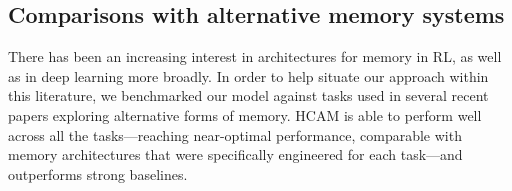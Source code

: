 \documentclass{article}
\begin{document}

\subsection{Comparisons with alternative memory systems} \label{sec:exp:other}

There has been an increasing interest in architectures for memory in RL, as well as in deep learning more broadly. In order to help situate our approach within this literature, we benchmarked our model against tasks used in several recent papers exploring alternative forms of memory. HCAM is able to perform well across all the tasks---reaching near-optimal performance, comparable with memory architectures that were specifically engineered for each task---and outperforms strong baselines.\vspace{-0.5em}
\end{document}
